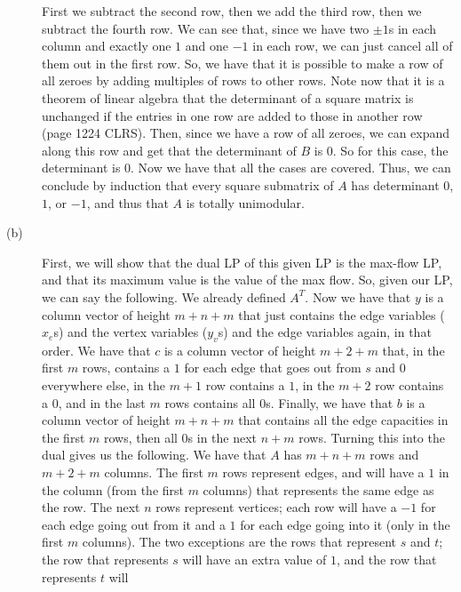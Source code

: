 \documentclass{article}
\begin{document}
\begin{description}
        First we subtract the second row, then we add the third row, then we
        subtract the fourth row. We can see that, since we have two $\pm1$s in
        each column and exactly one $1$ and one $-1$ in each row,
        we can just cancel all of them out in the first row.
        So, we have that it is possible to make a row of all zeroes by adding
        multiples of rows to other rows. Note now that it is a theorem of linear
        algebra that the determinant of a square matrix is unchanged if the
        entries in one row are added to those in another row (page 1224 CLRS).
        Then, since we have a row of all zeroes, we can expand along this row
        and get that the determinant of $B$ is $0$. So for this case, the determinant
        is $0$. Now we have that all the cases are covered. Thus, we can
        conclude by induction that every square submatrix of $A$ has determinant
        $0$, $1$, or $-1$, and thus that $A$ is totally unimodular.
    \item[(b)] First, we will show that the dual LP of this given LP is the
        max-flow LP, and that its maximum value is the value of the max flow.
        So, given our LP, we can say the following. We already defined $A^T$.
        Now we have that $y$ is a column vector of height $m + n + m$ that just contains the edge
        variables ($x_e$s) and the vertex variables ($y_v$s) and the edge
        variables again, in that order. We
        have that $c$ is a column vector of height $m + 2 + m$ that, in the
        first $m$ rows, contains a $1$ for
        each edge that goes out from $s$ and $0$ everywhere else, in the $m+1$
        row contains a $1$, in the $m+2$ row contains a $0$, and in the last $m$
        rows contains all $0$s. Finally, we
        have that $b$ is a column vector of height $m + n + m$ that contains all
        the edge capacities in the first $m$ rows, then all $0$s in the next
        $n+m$ rows. Turning this into the
        dual gives us the following. We have that $A$ has $m + n + m$ rows and
        $m + 2 + m$ columns. The first $m$ rows represent edges, and will have a
        $1$ in the column (from the first $m$ columns) that represents the same
        edge as the row. The next $n$ rows represent vertices; each row will
        have a $-1$ for each edge going out from it and a $1$ for each edge
        going into it (only in the first $m$ columns).
        The two exceptions are the rows that represent $s$ and
        $t$; the row that represents $s$ will have an extra value of $1$,
        and the row that represents $t$ will

\end{description}
\end{document}
